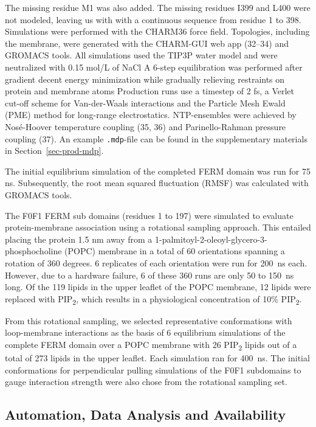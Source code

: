 \documentclass[
  letterpaper,
  DIV=11,
  numbers=noendperiod]{scrartcl}
\begin{document}
The missing residue M1 was also added. The missing residues I399 and
L400 were not modeled, leaving us with with a continuous sequence from
residue 1 to 398. Simulations were performed with the CHARM36 force
field. Topologies, including the membrane, were generated with the
CHARM-GUI web app (32--34) and GROMACS tools. All simulations used the
TIP3P water model and were neutralized with 0.15 mol/L of NaCl A 6-step
equilibration was performed after gradient decent energy minimization
while gradually relieving restraints on protein and membrane atoms
Production runs use a timestep of 2 fs, a Verlet cut-off scheme for
Van-der-Waals interactions and the Particle Mesh Ewald (PME) method for
long-range electrostatics. NTP-ensembles were achieved by Nosé-Hoover
temperature coupling (35, 36) and Parinello-Rahman pressure coupling
(37). An example \texttt{.mdp}-file can be found in the supplementary
materials in Section~\ref{sec-prod-mdp}.

The initial equilibrium simulation of the completed FERM domain was run
for 75 ns. Subsequently, the root mean squared fluctuation (RMSF) was
calculated with GROMACS tools.

The F0F1 FERM sub domains (residues 1 to 197) were simulated to evaluate
protein-membrane association using a rotational sampling approach. This
entailed placing the protein 1.5 nm away from a
1-palmitoyl-2-oleoyl-glycero-3-phosphocholine (POPC) membrane in a total
of 60 orientations spanning a rotation of 360 degrees. 6 replicates of
each orientation were run for 200~ns each. However, due to a hardware
failure, 6 of these 360 runs are only 50 to 150~ns long. Of the 119
lipids in the upper leaflet of the POPC membrane, 12 lipids were
replaced with PIP\textsubscript{2}, which results in a physiological
concentration of 10\% PIP\textsubscript{2}.

From this rotational sampling, we selected representative conformations
with loop-membrane interactions as the basis of 6 equilibrium
simulations of the complete FERM domain over a POPC membrane with 26
PIP\textsubscript{2} lipids out of a total of 273 lipids in the upper
leaflet. Each simulation ran for 400~ns. The initial conformations for
perpendicular pulling simulations of the F0F1 subdomains to gauge
interaction strength were also chose from the rotational sampling set.

\hypertarget{automation-data-analysis-and-availability}{%
\subsection{Automation, Data Analysis and
Availability}\label{automation-data-analysis-and-availability}}
\end{document}
